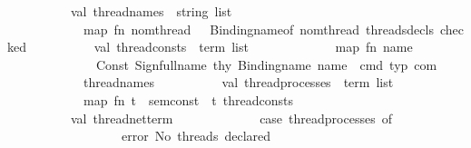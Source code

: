 \begin{isabellebody}
\ \ \ \ \ \ \ \ \ {\isacharparenleft}{\kern0pt}{\isacharasterisk}{\kern0pt}\ val\ thread{\isacharunderscore}{\kern0pt}names\ {\isacharcolon}{\kern0pt}\ string\ list\ {\isacharequal}{\kern0pt}\isanewline
\ \ \ \ \ \ \ \ \ \ \ \ map\ {\isacharparenleft}{\kern0pt}fn\ {\isacharbraceleft}{\kern0pt}nom{\isacharunderscore}{\kern0pt}thread{\isacharcomma}{\kern0pt}\ {\isachardot}{\kern0pt}{\isachardot}{\kern0pt}{\isachardot}{\kern0pt}{\isacharbraceright}{\kern0pt}\ {\isacharequal}{\kern0pt}{\isachargreater}{\kern0pt}\ Binding{\isachardot}{\kern0pt}name{\isacharunderscore}{\kern0pt}of\ nom{\isacharunderscore}{\kern0pt}thread{\isacharparenright}{\kern0pt}\ {\isacharparenleft}{\kern0pt}{\isacharhash}{\kern0pt}threads{\isacharunderscore}{\kern0pt}decls\ checked{\isacharparenright}{\kern0pt}\isanewline
\isanewline
\ \ \ \ \ \ \ \ \ \ val\ thread{\isacharunderscore}{\kern0pt}consts\ {\isacharcolon}{\kern0pt}\ term\ list\ {\isacharequal}{\kern0pt}\isanewline
\ \ \ \ \ \ \ \ \ \ \ \ map\ {\isacharparenleft}{\kern0pt}fn\ name\ {\isacharequal}{\kern0pt}{\isachargreater}{\kern0pt}\isanewline
\ \ \ \ \ \ \ \ \ \ \ \ \ \ Const\ {\isacharparenleft}{\kern0pt}Sign{\isachardot}{\kern0pt}full{\isacharunderscore}{\kern0pt}name\ thy\ {\isacharparenleft}{\kern0pt}Binding{\isachardot}{\kern0pt}name\ {\isacharparenleft}{\kern0pt}name\ {\isacharcircum}{\kern0pt}\ {\isachardoublequote}{\kern0pt}{\isacharunderscore}{\kern0pt}cmd{\isachardoublequote}{\kern0pt}{\isacharparenright}{\kern0pt}{\isacharparenright}{\kern0pt}{\isacharcomma}{\kern0pt}\ {\isacharat}{\kern0pt}{\isacharbraceleft}{\kern0pt}typ\ com{\isacharbraceright}{\kern0pt}{\isacharparenright}{\kern0pt}{\isacharparenright}{\kern0pt}\isanewline
\ \ \ \ \ \ \ \ \ \ \ \ thread{\isacharunderscore}{\kern0pt}names\isanewline
\isanewline
\isanewline
\ \ \ \ \ \ \ \ \ \ val\ thread{\isacharunderscore}{\kern0pt}processes\ {\isacharcolon}{\kern0pt}\ term\ list\ {\isacharequal}{\kern0pt}\isanewline
\ \ \ \ \ \ \ \ \ \ \ \ map\ {\isacharparenleft}{\kern0pt}fn\ t\ {\isacharequal}{\kern0pt}{\isachargreater}{\kern0pt}\ sem{\isacharunderscore}{\kern0pt}const\ {\isachardollar}{\kern0pt}\ t{\isacharparenright}{\kern0pt}\ thread{\isacharunderscore}{\kern0pt}consts\isanewline
\isanewline
\ \ \ \ \ \ \ \ \ \ val\ thread{\isacharunderscore}{\kern0pt}net{\isacharunderscore}{\kern0pt}term\ {\isacharequal}{\kern0pt}\isanewline
\ \ \ \ \ \ \ \ \ \ \ \ {\isacharparenleft}{\kern0pt}case\ thread{\isacharunderscore}{\kern0pt}processes\ of\isanewline
\ \ \ \ \ \ \ \ \ \ \ \ \ \ \ \ {\isacharbrackleft}{\kern0pt}{\isacharbrackright}{\kern0pt}\ {\isacharequal}{\kern0pt}{\isachargreater}{\kern0pt}\ error\ {\isachardoublequote}{\kern0pt}No\ threads\ declared{\isachardoublequote}{\kern0pt}\isanewline

\end{isabellebody}
